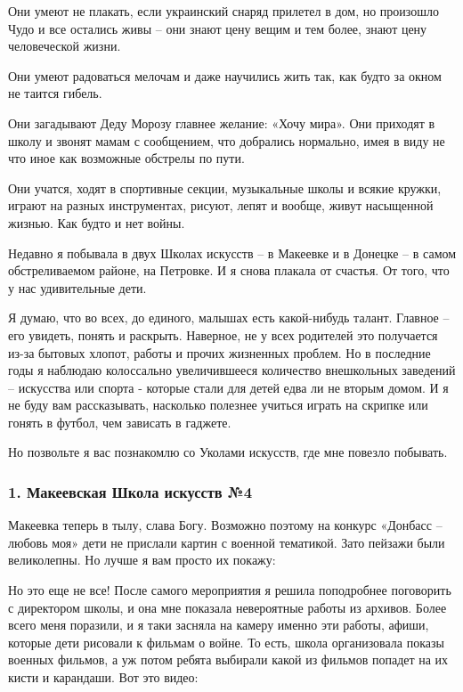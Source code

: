 Они умеют не плакать, если украинский снаряд прилетел в дом, но произошло Чудо
и все остались живы – они знают цену вещим и тем более, знают цену человеческой
жизни.

Они умеют радоваться мелочам и даже научились жить так, как будто за окном не
таится гибель.

Они загадывают Деду Морозу главнее желание: «Хочу мира». Они приходят в школу и
звонят мамам с сообщением, что добрались нормально, имея в виду не что иное как
возможные обстрелы по пути.

Они учатся, ходят в спортивные секции, музыкальные школы и всякие кружки,
играют на разных инструментах, рисуют, лепят и вообще, живут насыщенной жизнью.
Как будто и нет войны.

Недавно я побывала в двух Школах искусств – в Макеевке и в Донецке – в самом
обстреливаемом районе, на Петровке. И я снова плакала от счастья. От того, что
у нас удивительные дети.

Я думаю, что во всех, до единого, малышах есть какой-нибудь талант. Главное –
его увидеть, понять и раскрыть. Наверное, не у всех родителей это получается
из-за бытовых хлопот, работы и прочих жизненных проблем. Но в последние годы я
наблюдаю колоссально увеличившееся количество внешкольных заведений – искусства
или спорта - которые стали для детей едва ли не вторым домом. И я не буду вам
рассказывать, насколько полезнее учиться играть на скрипке или гонять в футбол,
чем зависать в гаджете.

Но позвольте я вас познакомлю со Уколами искусств, где мне повезло побывать.

\clearpage
\subsubsection{1. Макеевская Школа искусств №4}

Макеевка теперь в тылу, слава Богу. Возможно поэтому на конкурс «Донбасс –
любовь моя» дети не прислали картин с военной тематикой. Зато пейзажи были
великолепны. Но лучше я вам просто их покажу:


Но это еще не все! После самого мероприятия я решила поподробнее поговорить с
директором школы, и она мне показала невероятные работы из архивов. Более всего
меня поразили, и я таки засняла на камеру именно эти работы, афиши, которые
дети рисовали к фильмам о войне. То есть, школа организовала показы военных
фильмов, а уж потом ребята выбирали какой из фильмов попадет на их кисти и
карандаши. Вот это видео:

